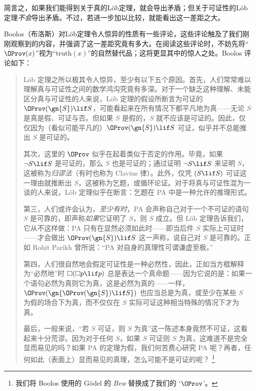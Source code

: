 简言之，如果我们能得到关于真的Löb定理，就会导出矛盾；但关于可证性的Löb定理\emph{不会}导出矛盾。不过，若进一步加以比较，就能看出这一差距之大。

Boolos（布洛斯）对Löb定理令人惊异的性质有一些评论，这些评论触及了我们刚刚观察到的内容，并强调了这一差距究竟有多大。在阅读这些评论时，不妨先将“$\OProv(x)$”视为“$\mathrm{truth}(x)$”的自然替代品；这将更显其中的惊人之处。Boolos 评论如下：


\begin{quotation}
Löb 定理之所以极其令人惊异，至少有以下五个原因。首先，人们常常难以理解真与可证性之间的数学鸿沟究竟有多深。对于一个缺乏这种理解、未能区分真与可证性的人来说，Löb 定理的假设所断言为可证的 $\OProv(\gn{S})\lif S$，可能看起来在所有情况下都平凡地为真——无论 $S$ 是真是假、可证与否。但如果 $S$ 是假的，$S$ 就不应该是可证的。因此，仅仅因为（看似可能平凡的）$\OProv(\gn{S})\lif S$ 可证，似乎并不总能推出 $S$ 是可证的。

其次，这里的 $\OProv$ 似乎在起着类似于否定的作用。毕竟，如果 $\lnot S \lif S$ 是可证的，那么 $S$ 也是可证的；通过证明 $\lnot S\lif S$ 来证明 $S$，这被称为\emph{归谬法}（有时也称为 Clavius 律）。此外，仅凭 $(S\lif S)$ 可证这一理由就推断出 $S$，这被称为乞题，或循环论证。对于将真与可证性混为一谈的人来说，Löb 定理似乎在断言：乞题在 PA 中是一种允许的推理形式。

第三，人们或许会认为，\emph{至少有时}，PA 会声称自己对于一个不可证的语句 $S$ 是可靠的，即声称\emph{如果}它证明了 $S$，则 $S$ 成立。但 Löb 定理告诉我们，它从不这样做：PA 只有在显然必须如此时——即当后件 $S$ 实际上可证时——才会做出 $\OProv(\gn{S})\lif S$ 这一声称，说自己对 $S$ 是可靠的。正如 Rohit Parikh 曾所说：“PA 对自身的真理性可谓谦虚至极。”

第四，人们很自然地会假定可证性是一种必然性，因此，正如当方框解释为“必然地”时 $\Box(\Box p \lif p)$ 总是表达一个真命题——因为它说的是：如果一个语句必然为真则它为真，这是必然为真的——一样，$\OProv(\gn{\OProv(\gn{S})\lif S})$ 也应当总是为真，或至少在某些 $S$ 为假的场合下为真，而不仅仅在 $S$ 实际可证这种相当特殊的情况下才为真。

最后，一般来说，“若 $S$ 可证，则 $S$ 为真”这一陈述本身竟然不可证，这看起来十分荒谬。因为对于任何 $S$，如果 $S$ 可证则 $S$ 为真，这难道不是完全显而易见的吗？如果 PA 的定理为假，我们何苦费心研究 PA 呢？再者，任何如此（表面上）显而易见的真理，怎么可能不是可证的呢？
\citep[pp.~54--55]{Boolos1993}\footnote{我们将 Boolos 使用的 Gödel 的 \textit{Bew} 替换成了我们的 `$\OProv$'。}
\end{quotation}

